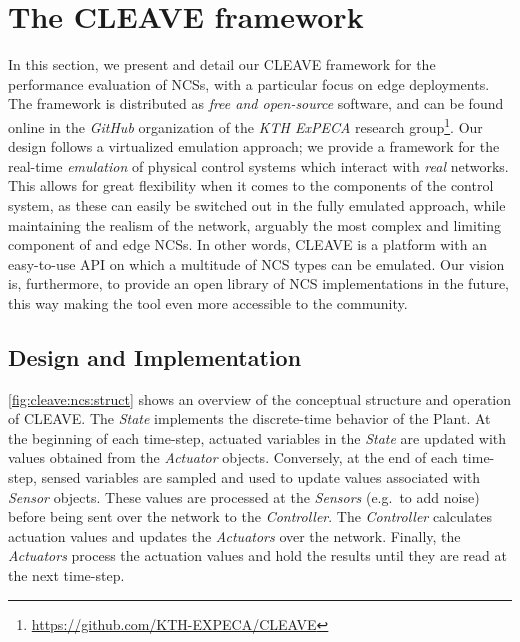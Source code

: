 \section{The \ac{CLEAVE} framework}\label{sec:approach}

In this section, we present and detail our \ac{CLEAVE} framework for the performance evaluation of \aclp{NCS}, with a particular focus on edge deployments.
The framework is distributed as \emph{free and open-source} software, and can be found online in the \emph{GitHub} organization of the \emph{KTH ExPECA} research group\footnote{\url{https://github.com/KTH-EXPECA/CLEAVE}}.
Our design follows a virtualized emulation approach; we provide a framework for the real-time \emph{emulation} of physical control systems which interact with \emph{real} networks.
This allows for great flexibility when it comes to the components of the control system, as these can easily be switched out in the fully emulated approach, while maintaining the realism of the network, arguably the most complex and limiting component of and edge \acp{NCS}.
In other words, \ac{CLEAVE} is a platform with an easy-to-use \ac{API} on which a multitude of \ac{NCS} types can be emulated.
Our vision is, furthermore, to provide an open library of \ac{NCS} implementations in the future, this way making the tool even more accessible to the community.


\subsection{Design and Implementation}

\cref{fig:cleave:ncs:struct} shows an overview of the conceptual structure and operation of \ac{CLEAVE}.
The \emph{State} implements the discrete-time behavior of the Plant.
At the beginning of each time-step, actuated variables in the \emph{State} are updated with values obtained from the \emph{Actuator} objects.
Conversely, at the end of each time-step, sensed variables are sampled and used to update values associated with \emph{Sensor} objects.
These values are processed at the \emph{Sensors} (e.g.\ to add noise) before being sent over the network to the \emph{Controller}.
The \emph{Controller} calculates actuation values and updates the \emph{Actuators} over the network.
Finally, the \emph{Actuators} process the actuation values and hold the results until they are read at the next time-step.

